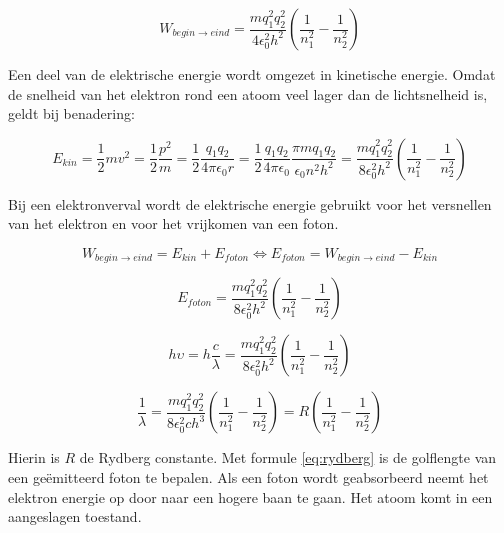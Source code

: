 \begin{equation}
W_{begin\rightarrow eind}
=\frac{mq_{1}^{2}q_{2}^{2}}{4\epsilon_{0}^{2}h^{2}}(\frac{1}{n_{1}^{2}}-\frac{1}{n_{2}^{2}})
\end{equation}


Een deel van de elektrische energie wordt omgezet in kinetische energie.
Omdat de snelheid van het elektron rond een atoom veel lager dan de
lichtsnelheid is, geldt bij benadering:

\begin{equation}
E_{kin}
=\frac{1}{2}mv^{2}
=\frac{1}{2}\frac{p^{2}}{m}
=\frac{1}{2}\frac{q_{1}q_{2}}{4\pi\epsilon_{0}r}
=\frac{1}{2}\frac{q_{1}q_{2}}{4\pi\epsilon_{0}}\frac{\pi mq_{1}q_{2}}{\epsilon_{0}n^{2}h^{2}}
=\frac{mq_{1}^{2}q_{2}^{2}}{8\epsilon_{0}^{2}h^{2}}(\frac{1}{n_{1}^{2}}-\frac{1}{n_{2}^{2}})
\end{equation}


Bij een elektronverval wordt de elektrische energie gebruikt voor
het versnellen van het elektron en voor het vrijkomen van een foton.

\begin{equation}
W_{begin\rightarrow eind}=E_{kin}+E_{foton}
\Longleftrightarrow E_{foton}=W_{begin\rightarrow eind}-E_{kin}
\end{equation}


\begin{equation}
E_{foton}
=\frac{mq_{1}^{2}q_{2}^{2}}{8\epsilon_{0}^{2}h^{2}}(\frac{1}{n_{1}^{2}}-\frac{1}{n_{2}^{2}})
\end{equation}


\begin{equation}
h\upsilon=h\frac{c}{\lambda}
=\frac{mq_{1}^{2}q_{2}^{2}}{8\epsilon_{0}^{2}h^{2}}(\frac{1}{n_{1}^{2}}-\frac{1}{n_{2}^{2}})
\end{equation}


\begin{equation} \label{eq:rydberg}
\frac{1}{\lambda}
=\frac{mq_{1}^{2}q_{2}^{2}}{8\epsilon_{0}^{2}ch^{3}}(\frac{1}{n_{1}^{2}}-\frac{1}{n_{2}^{2}})
=R(\frac{1}{n_{1}^{2}}-\frac{1}{n_{2}^{2}})
\end{equation}


Hierin is $R$ de Rydberg constante. Met formule \ref{eq:rydberg}
is de golflengte van een geëmitteerd foton te bepalen. Als een foton
wordt geabsorbeerd neemt het elektron energie op door naar een hogere
baan te gaan. Het atoom komt in een aangeslagen toestand.


